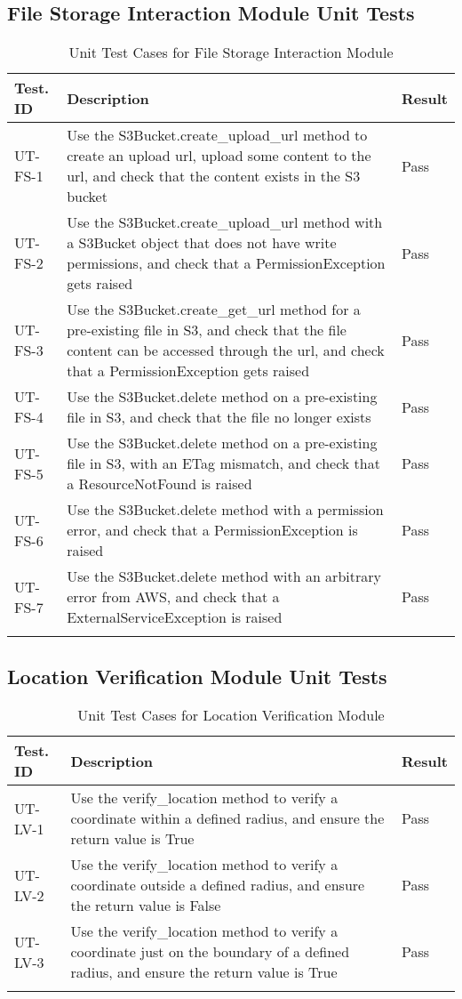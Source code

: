 \documentclass[12pt, titlepage]{article}
\begin{document}
\subsection{File Storage Interaction Module Unit Tests}

\begin{longtable}{|m{2cm}|m{10cm}|m{1.4cm}|}
  \hline
  \textbf{Test. ID} & \textbf{Description} & \textbf{Result} \\ \hline
  UT-FS-1 & Use the S3Bucket.create\_upload\_url method to create an
  upload url, upload some content to the url, and check that the
  content exists in the S3 bucket & Pass\\ \hline
  UT-FS-2 & Use the S3Bucket.create\_upload\_url method with a
  S3Bucket object that does not have write permissions, and check
  that a PermissionException gets raised & Pass\\ \hline
  UT-FS-3 & Use the S3Bucket.create\_get\_url method for a
  pre-existing file in S3, and check that the file content can be
  accessed through the url, and check that a PermissionException gets
  raised & Pass\\ \hline
  UT-FS-4 & Use the S3Bucket.delete method on a pre-existing file in
  S3, and check that the file no longer exists & Pass\\ \hline
  UT-FS-5 & Use the S3Bucket.delete method on a pre-existing file in
  S3, with an ETag mismatch, and check that a ResourceNotFound is
  raised & Pass\\ \hline
  UT-FS-6 & Use the S3Bucket.delete method with a permission error,
  and check that a PermissionException is raised & Pass\\ \hline
  UT-FS-7 & Use the S3Bucket.delete method with an arbitrary error
  from AWS, and check that a ExternalServiceException is raised & Pass\\ \hline
  \caption{Unit Test Cases for File Storage Interaction Module}
\end{longtable}

\subsection{Location Verification Module Unit Tests}

\begin{longtable}{|m{2cm}|m{10cm}|m{1.4cm}|}
  \hline
  \textbf{Test. ID} & \textbf{Description} & \textbf{Result} \\ \hline
  UT-LV-1 & Use the verify\_location method to verify a coordinate
  within a defined radius, and ensure the return value is True & Pass\\ \hline
  UT-LV-2 & Use the verify\_location method to verify a coordinate
  outside a defined radius, and ensure the return value is False & Pass\\ \hline
  UT-LV-3 & Use the verify\_location method to verify a coordinate
  just on the boundary of a defined radius, and ensure the return
  value is True & Pass\\ \hline
  \caption{Unit Test Cases for Location Verification Module}
\end{longtable}
\end{document}
